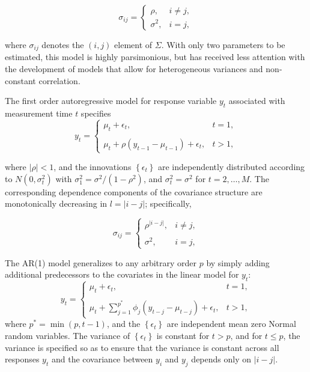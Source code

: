 \begin{equation}\label{eq:compound-symmetric-model}
\sigma_{ij} = \left\{ \begin{array}{lr}
\rho, & i \ne j,\\
\sigma^2, & i = j, 
\end{array}\right.
\end{equation}

\noindent
where $\sigma_{ij}$ denotes the $\left(i,j\right)$ element of $\Sigma$. With only two parameters to be estimated, this model is highly parsimonious, but has received less attention with the development of models that allow for heterogeneous variances and non-constant correlation. 

\bigskip

The first order autoregressive model for response variable $y_t$ associated with measurement time $t$ specifies
\begin{equation}\label{eq:ar-1-model}
y_{t} = \left\{ \begin{array}{lr}
\mu_t + \epsilon_t, & t = 1,\\
& \\
\mu_t + \rho\left(y_{t-1} - \mu_{t-1}\right) + \epsilon_t, & t > 1,
\end{array}\right.
\end{equation}

\noindent 
where $\vert \rho \vert < 1$, and the innovations $\left\{\epsilon_t\right\}$ are independently distributed according to $N\left(0,\sigma_t^2\right)$ with $\sigma_1^2 = \sigma^2/\left(1-\rho^2\right)$, and $\sigma_t^2 = \sigma^2$ for $t = 2, \dots, M$. The corresponding dependence components of the covariance structure are monotonically decreasing in $l = \vert i-j \vert$; specifically,

\begin{equation}\label{eq:compound-symmetric-model}
\sigma_{ij} = \left\{ \begin{array}{lr}
\rho^{\vert i - j \vert}, & i \ne j,\\
& \\
\sigma^2, & i = j, 
\end{array}\right.
\end{equation}

\noindent
The AR(1) model generalizes to any arbitrary order $p$ by simply adding additional predecessors to the covariates in the linear model for $y_t$:
\begin{equation*}
y_{t} = \left\{ \begin{array}{lr}
\mu_t + \epsilon_t, & t = 1,\\
& \\
\mu_t + \sum\limits_{j = 1}^{p^*} \phi_j\left(y_{t-j} - \mu_{t-j}\right) + \epsilon_t, & t > 1,
\end{array}\right.
\end{equation*}
\noindent
where $p^* = \min\left(p,t-1\right)$, and the $\left\{\epsilon_t\right\}$ are independent mean zero Normal random variables. The variance of $\left\{\epsilon_t\right\}$ is constant for $t > p$, and for $t \le p$, the variance is specified so as to ensure that the variance is constant across all responses $y_t$ and the covariance between $y_i$ and $y_j$ depends only on $\vert i - j\vert$. 

